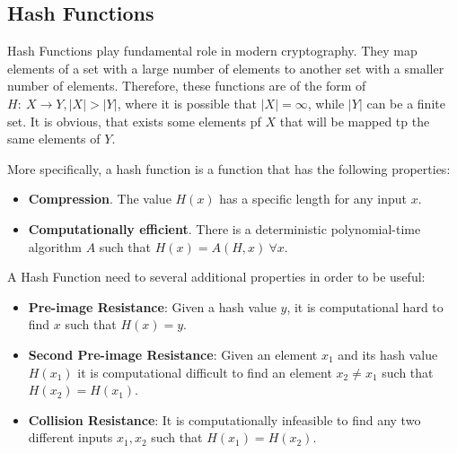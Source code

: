 \subsection{Hash Functions}

Hash Functions play fundamental role in modern cryptography. They map elements of a set with a large number of elements to another set with a smaller number of elements. Therefore, these functions are of the form of $H: \ X \rightarrow Y, |X| > |Y|$, where it is possible that $|X| = \infty$, while $|Y|$ can be a finite set. It is obvious, that exists some elements pf $X$ that will be mapped tp the same elements of $Y$.

More specifically, a hash function is a function that has the following properties:
\begin{itemize}
    \item \textbf{Compression}. The value $H(x)$ has a specific length for any input $x$.
    \item \textbf{Computationally efficient}. There is a deterministic polynomial-time algorithm $A$ such that $H(x) = A(H,x) \ \forall x$. 
\end{itemize}

A Hash Function need to several additional properties in order to be useful:
\begin{itemize}
    \item \textbf{Pre-image Resistance}: Given a hash value $y$, it is computational hard to find $x$ such that $H(x) = y$.
    \item \textbf{Second Pre-image Resistance}: Given an element $x_1$ and its hash value $H(x_1)$ it is computational difficult to find an element $x_2 \neq x_1$ such that $H(x_2) = H(x_1)$.
    \item \textbf{Collision Resistance}: It is computationally infeasible to find any two different inputs $x_1, x_2$ such that $H(x_1) = H(x_2)$.
\end{itemize}